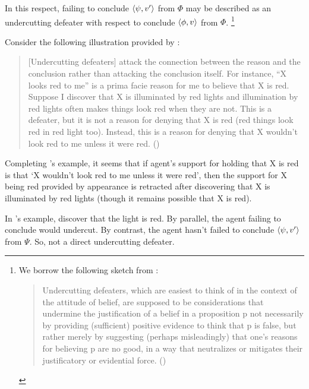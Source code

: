\begin{note}
  In this respect, failing to conclude \(\langle \psi, v' \rangle\) from \(\Phi\) may be described as an undercutting defeater with respect to conclude \(\langle \phi, v \rangle\) from \(\Phi\).%
  \footnote{
    We borrow the following sketch from \textcite{Worsnip:2018aa}:
  \begin{quote}
    Undercutting defeaters, which are easiest to think of in the context of the attitude of belief, are supposed to be considerations that undermine the justification of a belief in a proposition p not necessarily by providing (sufficient) positive evidence to think that p is false, but rather merely by suggesting (perhaps misleadingly) that one’s reasons for believing p are no good, in a way that neutralizes or mitigates their justificatory or evidential force.%
    \mbox{}\hfill\mbox{(\citeyear[29]{Worsnip:2018aa})}
  \end{quote}
  }

  Consider the following illustration provided by \citeauthor{Pollock:1987un}:
  \begin{quote}
    [Undercutting defeaters] attack the connection between the reason and the conclusion rather than attacking the conclusion itself.
    For instance, ``X looks red to me'' is a prima facie reason for me to believe that X is red.
    Suppose I discover that X is illuminated by red lights and illumination by red lights often makes things look red when they are not.
    This is a defeater, but it is not a reason for denying that X is red (red things look red in red light too).
    Instead, this is a reason for denying that X wouldn't look red to me unless it were red.%
    \mbox{}\hfill\mbox{(\citeyear[485]{Pollock:1987un})}
  \end{quote}
  Completing \citeauthor{Pollock:1987un}'s example, it seems that if agent's support for holding that X is red is that `X wouldn't look red to me unless it were red', then the support for X being red provided by appearance is retracted after discovering that X is illuminated by red lights (though it remains possible that X is red).
\end{note}

\begin{note}
  In \citeauthor{Pollock:1987un}'s example, discover that the light is red.
  By parallel, the agent failing to conclude would undercut.
  By contrast, the agent hasn't failed to conclude \(\langle \psi, v' \rangle\) from \(\Psi\).
  So, not a direct undercutting defeater.
\end{note}

